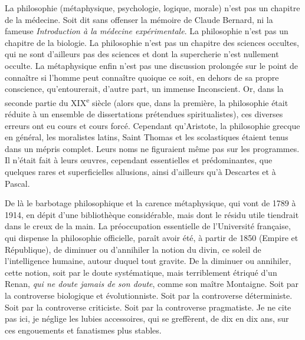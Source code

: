 \documentclass[french,twoside]{book} %
\begin{document}
La philosophie (métaphysique, psychologie, logique, morale) n’est pas un chapitre de la médecine. Soit dit sans offenser la mémoire de Claude Bernard, ni la fameuse {\itshape Introduction à la médecine expérimentale}. La philosophie n’est pas un chapitre de la biologie. La philosophie n’est pas un chapitre des sciences occultes, qui ne sont d’ailleurs pas des sciences et dont la supercherie n’est nullement occulte. La métaphysique enfin n’est pas une discussion prolongée sur le point de connaître si l’homme peut connaître quoique ce soit, en dehors de sa propre conscience, qu’entourerait, d’autre part, un immense Inconscient. Or, dans la seconde partie du XIX\textsuperscript{e} siècle (alors que, dans la première, la philosophie était réduite à un ensemble de dissertations prétendues spiritualistes), ces diverses erreurs ont eu cours et cours forcé. Cependant qu’Aristote, la philosophie grecque en général, les moralistes latins, Saint Thomas et les scolastiques étaient tenus dans un mépris complet. Leurs noms ne figuraient même pas sur les programmes. Il n’était fait à leurs œuvres, cependant essentielles et prédominantes, que quelques rares et superficielles allusions, ainsi d’ailleurs qu’à Descartes et à Pascal.\par
De là le barbotage philosophique et la carence métaphysique, qui vont de 1789 à 1914, en dépit d’une bibliothèque considérable, mais dont le résidu utile tiendrait dans le creux de la main. La préoccupation essentielle de l’Université française, qui dispense la philosophie officielle, paraît avoir été, à partir de 1850 (Empire et République), de diminuer ou d’annihiler la notion du divin, ce soleil de l’intelligence humaine, autour duquel tout gravite. De la diminuer ou annihiler, cette notion, soit par le doute systématique, mais terriblement étriqué d’un Renan, {\itshape qui ne doute jamais de son doute}, comme son maître Montaigne. Soit par la controverse biologique et évolutionniste. Soit par la controverse déterministe. Soit par la controverse criticiste. Soit par la controverse pragmatiste. Je ne cite pas ici, je néglige les lubies accessoires, qui se greffèrent, de dix en dix ans, sur ces engouements et fanatismes plus stables.\par
\end{document}
